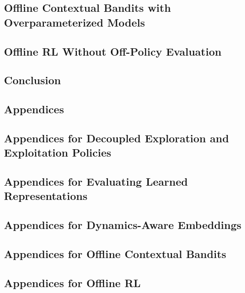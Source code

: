 \chapter{Offline Contextual Bandits with Overparameterized Models} \label{sec:offline-bandits}

\chapter{Offline RL Without Off-Policy Evaluation} \label{sec:offline-rl}



\chapter{Conclusion} \label{sec:conclusion}


\begin{appendices}
\part{Appendices}

\chapter{Appendices for Decoupled Exploration and Exploitation Policies}


\chapter{Appendices for Evaluating Learned Representations}


\chapter{Appendices for Dynamics-Aware Embeddings}


\chapter{Appendices for Offline Contextual Bandits}


\chapter{Appendices for Offline RL}



\end{appendices}



